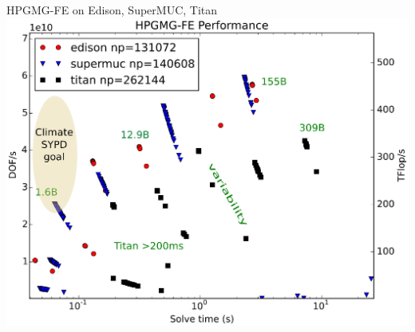 \documentclass{beamer}
\begin{document}
\begin{frame}{HPGMG-FE on Edison, SuperMUC, Titan}
  \includegraphics[width=\textwidth]{figures/hpgmg/range-edison-supermuc-titan-ann2.eps}
\end{frame}
\end{document}

